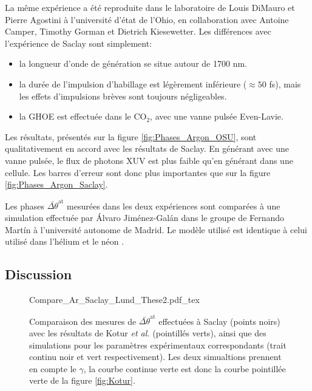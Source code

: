La même expérience a été reproduite dans le laboratoire de Louis DiMauro et Pierre Agostini à l'université d'état de l'Ohio, en collaboration avec Antoine Camper, Timothy Gorman et Dietrich Kiesewetter. Les différences avec l'expérience de Saclay sont simplement:
\begin{itemize}
\item la longueur d'onde de génération se situe autour de 1700 nm.
\item la durée de l'impulsion d'habillage est légèrement inférieure ($\approx 50$ fs), mais les effets d'impulsions brèves sont toujours négligeables.
\item la GHOE est effectuée dans le CO$_2$, avec une vanne pulsée Even-Lavie.
\end{itemize}
Les résultats, présentés sur la figure \ref{fig:Phases_Argon_OSU}, sont qualitativement en accord avec les résultats de Saclay. En générant avec une vanne pulsée, le flux de photons XUV est plus faible qu'en générant dans une cellule. Les barres d'erreur sont donc plus importantes que sur la figure \ref{fig:Phases_Argon_Saclay}.

Les phases $\bar{\Delta \theta}^{\text{at}}$ mesurées dans les deux expériences sont comparées à une simulation effectuée par \'{A}lvaro Jiménez-Gal\'{a}n dans le groupe de Fernando Mart\'{i}n à l'université autonome de Madrid. Le modèle utilisé est identique à celui utilisé dans l'hélium et le néon .

\subsection{Discussion}
\begin{figure}[ht]
\centering
\def\svgwidth{1\textwidth}
{Compare_Ar_Saclay_Lund_These2.pdf_tex}
\caption{Comparaison des mesures de $\bar{\Delta \theta}^{\text{at}}$ effectuées à Saclay (points noirs) avec les résultats de Kotur \textit{et al.} (pointillés verts), ainsi que des simulations pour les paramètres expérimentaux correspondants (trait continu noir et vert respectivement). Les deux simualtions prennent en compte le $\gamma$, la courbe continue verte est donc la courbe pointillée verte de la figure \ref{fig:Kotur}.}
\label{fig:Compare_Ar_Saclay_Lund_These}
\end{figure}

